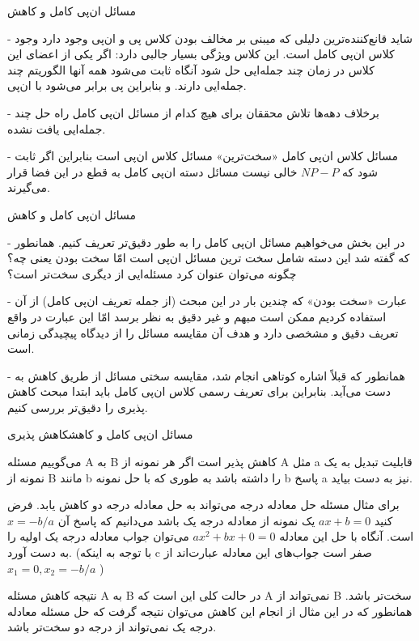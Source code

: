 \begin{itemframe}{مسائل ان‌پی کامل و کاهش}
\item[-]
شاید قانع‌کننده‌ترین دلیلی که میبنی بر مخالف بودن کلاس پی و ان‌پی وجود دارد وجود کلاس ان‌پی کامل است. این کلاس ویژگی بسیار جالبی دارد: اگر یکی از اعضای این کلاس در زمان چند جمله‌ایی حل شود آنگاه ثابت می‌شود همه آنها الگوریتم چند جمله‌ایی دارند. و بنابراین پی برابر می‌شود با ان‌پی.
\item[-]
برخلاف دهه‌ها تلاش محققان برای هیچ کدام از مسائل ان‌پی کامل راه حل چند جمله‌ایی یافت نشده.
\item[-]
مسائل کلاس ان‌پی کامل «سخت‌ترین» مسائل کلاس ان‌پی است بنابراین اگر ثابت شود که
$NP - P$
خالی نیست مسائل دسته ان‌پی کامل به قطع در این فضا قرار می‌گیرند.

\end{itemframe}


\begin{itemframe}{مسائل ان‌پی کامل و کاهش}
\item[-]
در این بخش می‌خواهیم مسائل ان‌پی کامل را به طور دقیق‌تر تعریف کنیم. همانطور که گفته شد این دسته شامل سخت ترین مسائل ان‌پی است امّا سخت بودن یعنی چه؟ چگونه می‌توان عنوان کرد مسئله‌ایی از دیگری سخت‌تر است؟
\item[-]
عبارت «سخت‌ بودن»
 که چندین بار در این مبحث (از جمله تعریف ان‌پی کامل) از آن استفاده کردیم ممکن است مبهم و غیر دقیق به نظر برسد امّا این عبارت در واقع تعریف دقیق و مشخصی دارد و هدف آن مقایسه مسائل را از دیدگاه پیچیدگی زمانی است.
\item[-]
همانطور که قبلاً اشاره کوتاهی انجام شد، مقایسه سختی مسائل  از طریق کاهش به دست می‌آید. بنابراین برای تعریف رسمی کلاس ان‌پی کامل باید ابتدا مبحث کاهش پذیری را دقیق‌تر بررسی کنیم.

\end{itemframe}


\begin{itemframe-s}{مسائل ان‌پی کامل و کاهش}{کاهش پذیری}
\item[-]
می‌گوییم مسئله A به B کاهش پذیر
 است اگر هر نمونه از A مثل a قابلیت تبدیل به یک نمونه از B مانند b را داشته باشد به طوری که با حل نمونه b پاسخ a نیز به دست بیاید.
\item[-]
برای مثال مسئله حل معادله درجه می‌تواند به حل معادله درجه دو کاهش یابد. فرض کنید $ax+b=0$ یک نمونه از معادله درجه یک باشد می‌دانیم که پاسخ آن
$ x = -b/a $
است.
آنگاه با حل این معادله $ ax^2+bx+0=0 $ می‌توان جواب معادله درجه یک اولیه را به دست آورد. (با توجه به اینکه c صفر است جواب‌های این معادله عبارت‌اند از
$ x_1 = 0, x_2= -b/a $
)

\item[-]
نتیجه کاهش مسئله A به B در حالت کلی این است که A نمی‌تواند از B سخت‌تر باشد. همانطور که در این مثال از انجام این کاهش می‌توان نتیجه گرفت که حل مسئله معادله درجه یک نمی‌تواند از درجه دو سخت‌تر باشد.
\end{itemframe-s}



